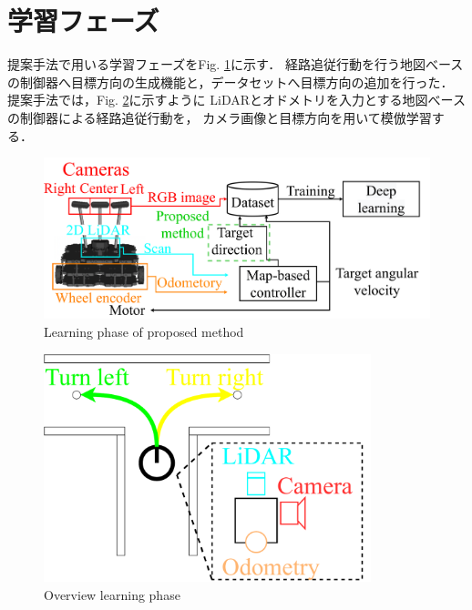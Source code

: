 \section{学習フェーズ}
\label{lerning}
提案手法で用いる学習フェーズをFig. \ref{fig::learningsystem}に示す．
経路追従行動を行う地図べースの制御器へ目標方向の生成機能と，データセットへ目標方向の追加を行った．
提案手法では，Fig. \ref{fig::learning_abs}に示すように
LiDARとオドメトリを入力とする地図べースの制御器による経路追従行動を，
カメラ画像と目標方向を用いて模倣学習する．
  \begin{figure}[h]
    \centering
    \includegraphics[width = 12cm]{./figs/system_learning.pdf}
    \caption{Learning phase of proposed method}
    \label{fig::learningsystem}
\end{figure}
\begin{figure}[h]
  \centering
  \includegraphics[width = 9.5cm]{./figs/ler_abs.pdf}
  \caption{Overview learning phase}
  \label{fig::learning_abs}
\end{figure}
\newpage

